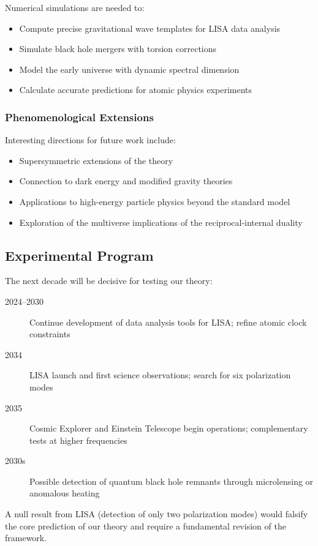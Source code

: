 Numerical simulations are needed to:
\begin{itemize}
    \item Compute precise gravitational wave templates for LISA data analysis
    \item Simulate black hole mergers with torsion corrections
    \item Model the early universe with dynamic spectral dimension
    \item Calculate accurate predictions for atomic physics experiments
\end{itemize}

\subsubsection{Phenomenological Extensions}

Interesting directions for future work include:
\begin{itemize}
    \item Supersymmetric extensions of the theory
    \item Connection to dark energy and modified gravity theories
    \item Applications to high-energy particle physics beyond the standard model
    \item Exploration of the multiverse implications of the reciprocal-internal duality
\end{itemize}

\subsection{Experimental Program}

The next decade will be decisive for testing our theory:

\begin{description}
    \item[2024--2030] Continue development of data analysis tools for LISA; refine atomic clock constraints
    \item[2034] LISA launch and first science observations; search for six polarization modes
    \item[2035] Cosmic Explorer and Einstein Telescope begin operations; complementary tests at higher frequencies
    \item[2030s] Possible detection of quantum black hole remnants through microlensing or anomalous heating
\end{description}

A null result from LISA (detection of only two polarization modes) would falsify the core prediction of our theory and require a fundamental revision of the framework.


